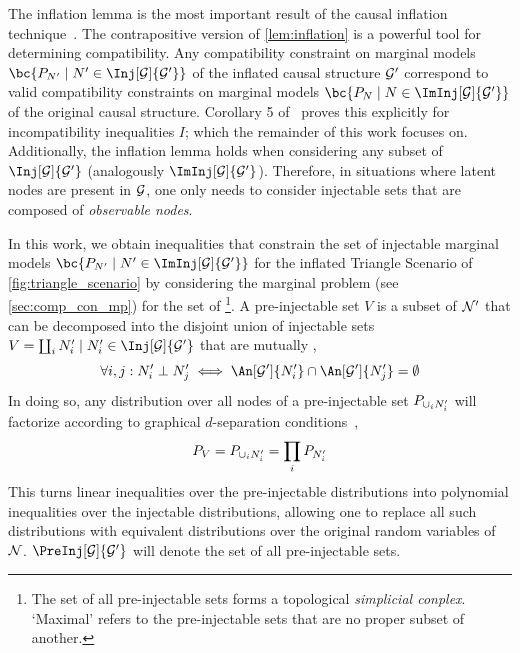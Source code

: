 \documentclass[aps, 10pt, english, twoside, pra, nofootinbib, longbibliography]{revtex4-1}
\begin{document}
    The inflation lemma is the most important result of the causal inflation technique~\cite{Inflation}. The contrapositive version of \cref{lem:inflation} is a powerful tool for determining compatibility. Any compatibility constraint on marginal models $\bc{\prob[N'] \mid N' \in \Inj[\graph]{\graph'}}$ of the inflated causal structure $\mathcal{G}'$ correspond to valid compatibility constraints on marginal models $\bc{\prob[N] \mid N \in \ImInj[\graph]{\graph'}}$ of the original causal structure. Corollary 5 of~\cite{Inflation} proves this explicitly for incompatibility inequalities $I$; which the remainder of this work focuses on.  Additionally, the inflation lemma holds when considering any subset of $\Inj[\graph]{\graph'}$ (analogously $\ImInj[\graph]{\graph'}$). Therefore, in situations where latent nodes are present in $\mathcal{G}$, one only needs to consider injectable sets that are composed of \textit{observable nodes}.

    In this work, we obtain inequalities that constrain the set of injectable marginal models $\bc{\prob[N'] \mid N' \in \ImInj[\graph]{\graph'}}$ for the inflated Triangle Scenario of \cref{fig:triangle_scenario} by considering the marginal problem (see \cref{sec:comp_con_mp}) for the set of \footnote{The set of all pre-injectable sets forms a topological \textit{simplicial conplex}. `Maximal' refers to the pre-injectable sets that are no proper subset of another.}. A pre-injectable set $V$ is a subset of $\mathcal{N}'$ that can be decomposed into the disjoint union of injectable sets $V = \coprod_i N'_i \mid N'_i \in \Inj[\graph]{\graph'}$ that are mutually ,
    \[ \forall i,j : N'_i \ancestralindep N'_j \iff \An[\graph']{N'_i} \cap \An[\graph']{N'_j} = \emptyset  \]
    In doing so, any distribution over all nodes of a pre-injectable set $\prob[\cup_i N'_i]$ will factorize according to graphical $d$-separation conditions~\cite{Pearl_2009},
    \[ \prob[V] = \prob[\cup_i N'_i] = \prod_{i}\prob[N'_i] \]
    This turns linear inequalities over the pre-injectable distributions into polynomial inequalities over the injectable distributions, allowing one to replace all such distributions with equivalent distributions over the original random variables of $\mathcal{N}$. $\PreInj[\graph]{\graph'}$ will denote the set of all pre-injectable sets.
\end{document}
